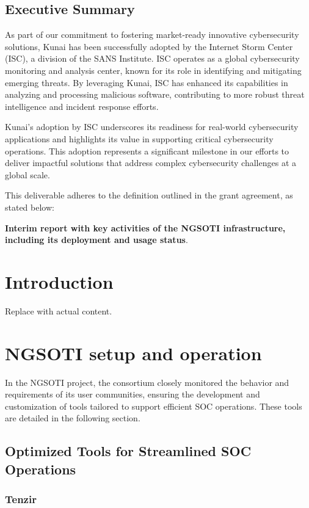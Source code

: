 \section*{Executive Summary}

As part of our commitment to fostering market-ready innovative cybersecurity solutions, Kunai has been successfully adopted by the Internet Storm Center (ISC)\cite{kunai_isc_sans}, a division of the SANS Institute. ISC operates as a global cybersecurity monitoring and analysis center, known for its role in identifying and mitigating emerging threats. By leveraging Kunai, ISC has enhanced its capabilities in analyzing and processing malicious software, contributing to more robust threat intelligence and incident response efforts.

Kunai's adoption by ISC underscores its readiness for real-world cybersecurity applications and highlights its value in supporting critical cybersecurity operations. This adoption represents a significant milestone in our efforts to deliver impactful solutions that address complex cybersecurity challenges at a global scale.


This deliverable adheres to the definition outlined in the grant agreement, as stated below:

\textbf{ Interim report with key activities of the NGSOTI infrastructure, including its deployment and usage status}.


\chapter{Introduction}
Replace with actual content.

\chapter{NGSOTI setup and operation}
In the NGSOTI project, the consortium closely monitored the behavior and requirements of its user communities, ensuring the development and customization of tools tailored to support efficient SOC operations. These tools are detailed in the following section.

\section{Optimized Tools for Streamlined SOC Operations}


\subsection{Tenzir}


